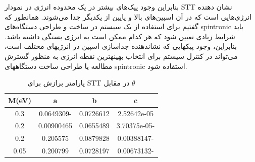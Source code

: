 بنابراین وجود پیک‌های بیشتر در یک محدوده انرژی در نمودار \gls{STT} نشان دهنده انرژی‌هایی است که در آن اسپین‌های بالا و پایین از یکدیگر جدا ‌‌می‌‌شوند. همانطور که گفتیم برای استفاده از یک سیستم در ساخت و طراحی دستگاه‌های \gls{spintronic} باید شرایط زیادی تعیین شود که هر کدام ممکن است به انرژی بستگی داشته باشد. بنابراین، وجود پیکهایی که نشاندهنده جداسازی اسپین در انرژیهای مختلف است، ‌می‌تواند در کنترل سیستم برای انتخاب بهینهترین نقطه انرژی به منظور گسترش مطالعه یا طراحی ساخت دستگاههای \gls{spintronic} استفاده شود.

\begin{table}[t]
  \caption{ پارامتر برازش برای \gls{STT} در مقابل $\theta$}
    \centering
      \label{tbl:fitting}
      \begin{tabular}{cccc}
        \toprule
        M(eV) & a & b & c \\
        \midrule
        0.3 & 0.0649309- & 0.0726612 & 2.52642e-05 \\
        0.2 & 0.00900465 & 0.0655489 & 3.70375e-05- \\
        0.2 & 0.205575 & 0.0879828 & 0.00388147- \\
        0.05 & 0.200799 & 0.0728197 & 0.00673132- \\
        \bottomrule
      \end{tabular}
  \end{table}


